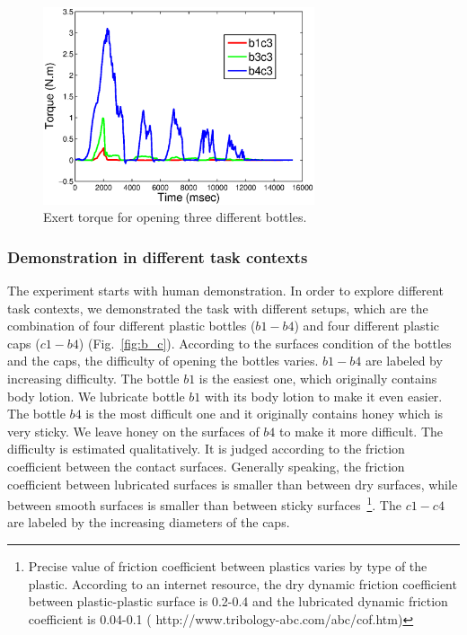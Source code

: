\begin{figure}
  \centering
  \includegraphics[width=8cm]{./fig/b1b3b4_time_T_3.eps}
  \caption{ \scriptsize{Exert torque for opening three different bottles.}
}
\label{fig:bottlepatterns}
\end{figure}


\subsubsection{Demonstration in different task contexts}
\label{sec:exp_context}
The experiment starts with human demonstration. In order to explore different task contexts, we demonstrated the task with different setups, which are the combination of four different plastic bottles ($b1-b4$) and four different plastic caps ($c1-b4$) (Fig.~\ref{fig:b_c}). 
According to the surfaces condition of the bottles and the caps, the difficulty of opening the bottles varies. $b1-b4$ are labeled by increasing difficulty. The bottle $b1$ is the easiest one, which originally contains body lotion. We lubricate bottle $b1$ with its body lotion to make it even easier. The bottle $b4$ is the most difficult one and it originally contains honey which is very sticky. We leave honey on the surfaces of $b4$ to make it more difficult. The difficulty is estimated qualitatively. It is judged according to the friction coefficient between the contact surfaces. Generally speaking, the friction coefficient between lubricated surfaces is smaller than between dry surfaces, while between smooth  surfaces is smaller than between sticky surfaces~\footnote{Precise value of friction coefficient between plastics varies by type of the plastic. According to an internet resource, the dry dynamic friction coefficient between plastic-plastic surface is 0.2-0.4 and the lubricated dynamic friction coefficient is 0.04-0.1 ( http://www.tribology-abc.com/abc/cof.htm)}. The $c1-c4$ are labeled by the increasing diameters of the caps.

